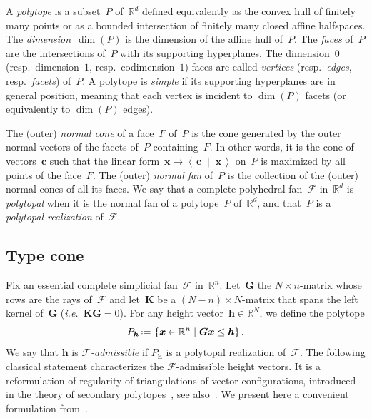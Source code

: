 \documentclass{amsart}
\theoremstyle{definition}
\newcommand{\R}{\mathbb{R}} %
\renewcommand{\b}[1]{{\boldsymbol{#1}}} %
\newcommand{\set}[2]{\left\{ #1 \;\middle|\; #2 \right\}} %
\newcommand{\dotprod}[2]{\left\langle \, #1 \; \middle| \; #2 \, \right\rangle} %
\newcommand{\eqdef}{\mbox{\,\raisebox{0.2ex}{\scriptsize\ensuremath{\mathrm:}}\ensuremath{=}\,}} %
\newcommand{\ie}{\textit{i.e.}~} %
\newcommand{\darkblue}{\color{darkblue}} %
\newcommand{\defn}[1]{\textsl{\darkblue #1}} %
\newcommand{\Fan}{\mathcal{F}} %
\begin{document}
A \defn{polytope} is a subset~$P$ of~$\R^d$ defined equivalently as the convex hull of finitely many points or as a bounded intersection of finitely many closed affine halfspaces.
The \defn{dimension}~$\dim(P)$ is the dimension of the affine hull of~$P$.
The \defn{faces} of~$P$ are the intersections of~$P$ with its supporting hyperplanes.
The dimension~$0$ (resp.~dimension~$1$, resp.~codimension~$1$) faces are called \defn{vertices} (resp.~\defn{edges}, resp.~\defn{facets}) of~$P$.
A polytope is \defn{simple} if its supporting hyperplanes are in general position, meaning that each vertex is incident to $\dim(P)$ facets (or equivalently to $\dim(P)$ edges).

The (outer) \defn{normal cone} of a face~$F$ of~$P$ is the cone generated by the outer normal vectors of the facets of~$P$ containing~$F$.
In other words, it is the cone of vectors~$\b{c}$ such that the linear form~${\b{x} \mapsto \dotprod{\b{c}}{\b{x}}}$ on~$P$ is maximized by all points of the face~$F$.
The (outer) \defn{normal fan} of~$P$ is the collection of the (outer) normal cones of all its faces.
We say that a complete polyhedral fan~$\Fan$ in~$\R^d$ is \defn{polytopal} when it is the normal fan of a polytope~$P$ of~$\R^d$, and that~$P$ is a \defn{polytopal realization} of~$\Fan$.


\subsection{Type cone}

Fix an essential complete simplicial fan~$\Fan$ in~$\R^n$. Let~$\b{G}$ the $N \times n$-matrix whose rows are the rays of~$\Fan$ and let~$\b{K}$ be a $(N-n) \times N$-matrix that spans the left kernel of~$\b{G}$ (\ie $\b{K}\b{G} = 0$). For any height vector~$\b{h} \in \R^N$, we define the polytope
\[
P_\b{h} \eqdef \set{\b{x} \in \R^n}{\b{G}\b{x} \le \b{h}}.
\]
We say that $\b{h}$ is \defn{$\Fan$-admissible} if $P_\b{h}$ is a polytopal realization of~$\Fan$.
The following classical statement characterizes the $\Fan$-admissible height vectors.
It is a reformulation of regularity of triangulations of vector configurations, introduced in the theory of secondary polytopes~\cite{GelfandKapranovZelevinsky}, see also~\cite{DeLoeraRambauSantos}.
We present here a convenient formulation from~\cite[Lem.~2.1]{ChapotonFominZelevinsky}.
\end{document}
